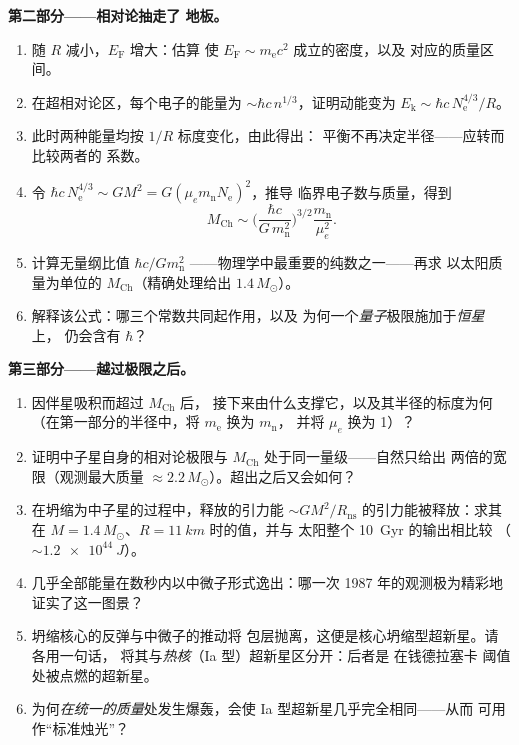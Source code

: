 \begin{problem}
\medskip\noindent\textbf{第二部分——相对论抽走了
地板。}
\begin{enumerate}[resume]
  \item 随 $R$ 减小，$E_{\text{F}}$ 增大：估算
        使 $E_{\text{F}} \sim m_{\text{e}}c^2$ 成立的密度，以及
        对应的质量区间。
  \item 在超相对论区，每个电子的能量为
        $\sim\hbar c\,n^{1/3}$，证明动能变为
        $E_{\text{k}} \sim \hbar c\,N_{\text{e}}^{4/3}/R$。
  \item 此时两种能量均按 $1/R$ 标度变化，由此得出：
        平衡不再决定半径——应转而比较两者的
        系数。
  \item 令 $\hbar c\,N_{\text{e}}^{4/3} \sim
        GM^2 = G(\mu_em_{\text{n}}N_{\text{e}})^2$，推导
        临界电子数与质量，得到
        \[
        M_{\text{Ch}} \sim
        \Big(\frac{\hbar c}{G\,m_{\text{n}}^2}\Big)^{3/2}
        \frac{m_{\text{n}}}{\mu_e^2} .
        \]
  \item 计算无量纲比值 $\hbar c/Gm_{\text{n}}^2$
        ——物理学中最重要的纯数之一——再求
        以太阳质量为单位的 $M_{\text{Ch}}$（精确处理给出
        $1.4\,M_\odot$）。
  \item 解释该公式：哪三个常数共同起作用，以及
        为何一个\emph{量子}极限施加于\emph{恒星}上，
        仍会含有 $\hbar$？
\end{enumerate}

\medskip\noindent\textbf{第三部分——越过极限之后。}
\begin{enumerate}[resume]
  \item {}因伴星吸积而超过 $M_{\text{Ch}}$ 后，
        接下来由什么支撑它，以及其半径的标度为何
        （在第一部分的半径中，将 $m_{\text{e}}$ 换为 $m_{\text{n}}$，
        并将 $\mu_e$ 换为 1）？
  \item 证明中子星自身的相对论极限与
        $M_{\text{Ch}}$ 处于同一量级——自然只给出
        两倍的宽限（观测最大质量 $\approx
        2.2\,M_\odot$）。超出之后又会如何？
  \item 在坍缩为中子星的过程中，释放的引力能 $\sim GM^2/R_{
        \text{ns}}$ 的引力能被释放：求其在
        $M = 1.4\,M_\odot$、$R = \qty{11}{km}$ 时的值，并与
        太阳整个 \qty{10}{Gyr} 的输出相比较
        （$\sim\qty{1.2e44}{J}$）。
  \item 几乎全部能量在数秒内以中微子形式逸出：哪一次
        1987 年的观测极为精彩地证实了这一图景？
  \item 坍缩核心的反弹与中微子的推动将
        包层抛离，这便是核心坍缩型超新星。请各用一句话，
        将其与\emph{热核}（Ia 型）超新星区分开：后者是
        在钱德拉塞卡
        阈值处被点燃的超新星。
  \item 为何\emph{在统一的质量}处发生爆轰，会使
        Ia 型超新星几乎完全相同——从而
        可用作“标准烛光”？
\end{enumerate}


\end{problem}
